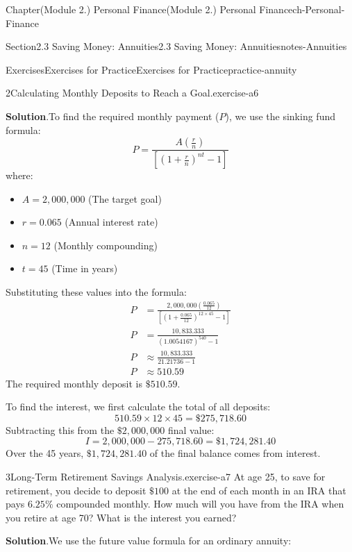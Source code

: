 \documentclass[oneside,10pt,]{book}
\newcommand{\blocktitlefont}{\relax}
\newcommand{\ptxlistdisc}{\raisebox{0.3ex}{\textbullet}}
\newcommand{\amp}{&}
\begin{document}
\begin{chapterptx}{Chapter}{(Module 2.) Personal Finance}{}{(Module 2.) Personal Finance}{}{}{ch-Personal-Finance}
\begin{sectionptx}{Section}{2.3 Saving Money: Annuities}{}{2.3 Saving Money: Annuities}{}{}{notes-Annuities}
\begin{exercises-subsection-numberless}{Exercises}{Exercises for Practice}{}{Exercises for Practice}{}{}{practice-annuity}
\begin{divisionexercise}{2}{Calculating Monthly Deposits to Reach a Goal.}{}{exercise-a6}
\par\smallskip%
\noindent\textbf{\blocktitlefont Solution}.\hypertarget{exercise-a6-3}{}\quad{}To find the required monthly payment (\(P\)), we use the sinking fund formula:%
\begin{equation*}
P = \frac{A \left( \frac{r}{n} \right)}{\left[ \left( 1 + \frac{r}{n} \right)^{nt} - 1 \right]}
\end{equation*}
where:%
\begin{itemize}[label=\ptxlistdisc]
\item{}\(A = 2,000,000\) (The target goal)%
\item{}\(r = 0.065\) (Annual interest rate)%
\item{}\(n = 12\) (Monthly compounding)%
\item{}\(t = 45\) (Time in years)%
\end{itemize}
%
\par
Substituting these values into the formula:%
\begin{align*}
P \amp = \frac{2,000,000 \left( \frac{0.065}{12} \right)}{\left[ \left( 1 + \frac{0.065}{12} \right)^{12 \times 45} - 1 \right]}\\
P \amp = \frac{10,833.333}{(1.0054167)^{540} - 1}\\
P \amp \approx \frac{10,833.333}{21.21736 - 1}\\
P \amp \approx 510.59
\end{align*}
The required monthly deposit is \(\$510.59\).%
\par
To find the interest, we first calculate the total of all deposits:%
\begin{equation*}
510.59 \times 12 \times 45 = \$275,718.60
\end{equation*}
Subtracting this from the \(\$2,000,000\) final value:%
\begin{equation*}
I = 2,000,000 - 275,718.60 = \$1,724,281.40
\end{equation*}
Over the 45 years, \(\$1,724,281.40\) of the final balance comes from interest.%
\end{divisionexercise}%
\begin{divisionexercise}{3}{Long-Term Retirement Savings Analysis.}{}{exercise-a7}%
At age 25, to save for retirement, you decide to deposit \(\$100\) at the end of each month in an IRA that pays \(6.25\%\) compounded monthly. How much will you have from the IRA when you retire at age 70? What is the interest you earned?%
\par\smallskip%
\noindent\textbf{\blocktitlefont Solution}.\hypertarget{exercise-a7-3}{}\quad{}We use the future value formula for an ordinary annuity:%

\end{divisionexercise}
\end{exercises-subsection-numberless}
\end{sectionptx}
\end{chapterptx}
\end{document}
